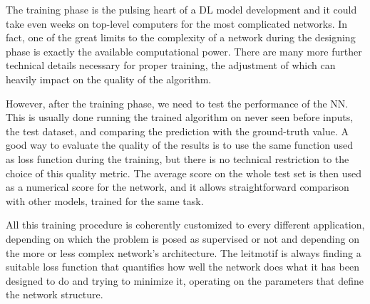 The training phase is the pulsing heart of a DL model development and it could take even weeks on top-level computers for the most complicated networks. In fact, one of the great limits to the complexity of a network during the designing phase is exactly the available computational power. There are many more further technical details necessary for proper training, the adjustment of which can heavily impact on the quality of the algorithm.

However, after the training phase, we need to test the performance of the NN. This is usually done running the trained algorithm on never seen before inputs, the test dataset, and comparing the prediction with the ground-truth value. A good way to evaluate the quality of the results is to use the same function used as loss function during the training, but there is no technical restriction to the choice of this quality metric. The average score on the whole test set is then used as a numerical score for the network, and it allows straightforward comparison with other models, trained for the same task.

All this training procedure is coherently customized to every different application, depending on which the problem is posed as supervised or not and depending on the more or less complex network's architecture. The leitmotif is always finding a suitable loss function that quantifies how well the network does what it has been designed to do and trying to minimize it, operating on the parameters that define the network structure.
